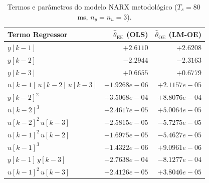 \begin{table}[H]
    \centering
    \caption{Termos e parâmetros do modelo NARX metodológico ($T_s = 80$\,ms, $n_y = n_u = 3$).}
    \label{tab:narx_termos}
    \begin{tabular}{lrr}
        \toprule
        \textbf{Termo Regressor} & $\hat{\theta}_{\text{EE}}$ (OLS) & $\hat{\theta}_{\text{OE}}$ (LM-OE) \\ \midrule
        $y[k-1]$                           & $+2.6110$ & $+2.6208$ \\
        $y[k-2]$                           & $-2.2944$ & $-2.3163$ \\
        $y[k-3]$                           & $+0.6655$ & $+0.6779$ \\
        $u[k-1]\,u[k-2]\,u[k-3]$           & $+1.9268e-06$ & $+2.1157e-05$ \\
        $y[k-2]^2$                         & $+3.5068e-04$ & $+8.8076e-04$ \\
        $u[k-2]^3$                         & $+2.4617e-05$ & $+5.0064e-05$ \\
        $u[k-2]^2\,u[k-3]$                 & $-2.5815e-05$ & $-5.7275e-05$ \\
        $u[k-1]^2\,u[k-2]$                 & $-1.6975e-05$ & $-5.4627e-05$ \\
        $u[k-1]^3$                         & $-1.4322e-06$ & $+9.0961e-06$ \\
        $y[k-1]\,y[k-3]$                   & $-2.7638e-04$ & $-8.1277e-04$ \\
        $u[k-1]^2\,u[k-3]$                 & $+2.4126e-05$ & $+3.8046e-05$ \\
        \bottomrule
    \end{tabular}
\end{table}
